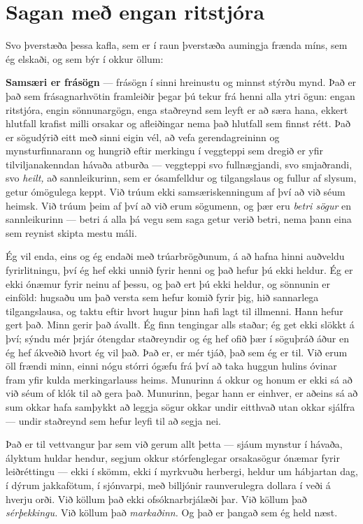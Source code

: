 \section*{Sagan með engan ritstjóra}

Svo þverstæða þessa kafla, sem er í raun þverstæða aumingja frænda míns, sem ég elskaði, og sem býr í okkur öllum:

\textbf{Samsæri er frásögn} — frásögn í sinni hreinustu og minnst stýrðu mynd. Það er það sem frásagnarhvötin framleiðir þegar þú tekur frá henni alla ytri ögun: engan ritstjóra, engin sönnunargögn, enga staðreynd sem leyft er að særa hana, ekkert hlutfall krafist milli orsakar og afleiðingar nema það hlutfall sem finnst rétt. Það er sögudýrið eitt með sinni eigin vél, að vefa gerendagreininn og mynsturfinnarann og hungrið eftir merkingu í veggteppi sem dregið er yfir tilviljanakenndan hávaða atburða — veggteppi svo fullnægjandi, svo smjaðrandi, svo \emph{heilt,} að sannleikurinn, sem er ósamfelldur og tilgangslaus og fullur af slysum, getur ómögulega keppt. Við trúum ekki samsæriskenningum af því að við séum heimsk. Við trúum þeim af því að við erum sögumenn, og þær eru \emph{betri sögur} en sannleikurinn — betri á alla þá vegu sem saga getur verið betri, nema þann eina sem reynist skipta mestu máli.

Ég vil enda, eins og ég endaði með trúarbrögðunum, á að hafna hinni auðveldu fyrirlitningu, því ég hef ekki unnið fyrir henni og það hefur þú ekki heldur. Ég er ekki ónæmur fyrir neinu af þessu, og það ert þú ekki heldur, og sönnunin er einföld: hugsaðu um það versta sem hefur komið fyrir þig, hið sannarlega tilgangslausa, og taktu eftir hvort hugur þinn hafi lagt til illmenni. Hann hefur gert það. Minn gerir það ávallt. Ég finn tengingar alls staðar; ég get ekki slökkt á því; sýndu mér þrjár ótengdar staðreyndir og ég hef ofið þær í söguþráð áður en ég hef ákveðið hvort ég vil það. Það er, er mér tjáð, það sem ég er til. Við erum öll frændi minn, einni nógu stórri ógæfu frá því að taka huggun hulins óvinar fram yfir kulda merkingarlauss heims. Munurinn á okkur og honum er ekki sá að við séum of klók til að gera það. Munurinn, þegar hann er einhver, er aðeins sá að sum okkar hafa samþykkt að leggja sögur okkar undir eitthvað utan okkar sjálfra — undir staðreynd sem hefur leyfi til að segja nei.

Það er til vettvangur þar sem við gerum allt þetta — sjáum mynstur í hávaða, ályktum huldar hendur, segjum okkur stórfenglegar orsakasögur ónæmar fyrir leiðréttingu — ekki í skömm, ekki í myrkvuðu herbergi, heldur um hábjartan dag, í dýrum jakkafötum, í sjónvarpi, með billjónir raunverulegra dollara í veði á hverju orði. Við köllum það ekki ofsóknarbrjálæði þar. Við köllum það \emph{sérþekkingu.} Við köllum það \emph{markaðinn.} Og það er þangað sem ég held næst.

